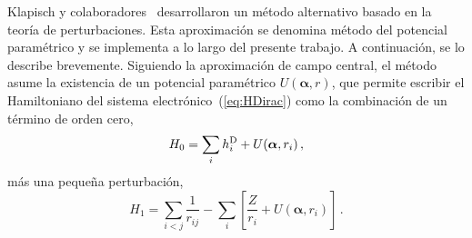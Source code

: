 Klapisch y colaboradores~\cite{Klapisch:71,Klapisch:67,Klapisch:77,
BarShalom:01} desarrollaron un método alternativo basado en la teoría de 
perturbaciones. Esta aproximación se denomina método del potencial 
paramétrico y se implementa a lo largo del presente trabajo. A 
continuación, se lo describe brevemente. 
Siguiendo la aproximación de campo central, el método asume la 
existencia de un potencial paramétrico $U(\boldsymbol{\alpha},r)$, que 
permite escribir el Hamiltoniano del sistema 
electrónico~(\ref{eq:HDirac}) como la combinación de un término de orden 
cero,
\begin{equation}
 H_0 = \sum_i h_i^{\mbox{\scriptsize D}} + U(\boldsymbol{\alpha},r_i)\,,
\end{equation}
más una pequeña perturbación,
\begin{equation}
 H_1 = \sum_{i<j}\frac{1}{r_{ij}}
 - \sum_i \left[ \frac{Z}{r_i} + U(\boldsymbol{\alpha},r_i) \right]\,.
\end{equation}

